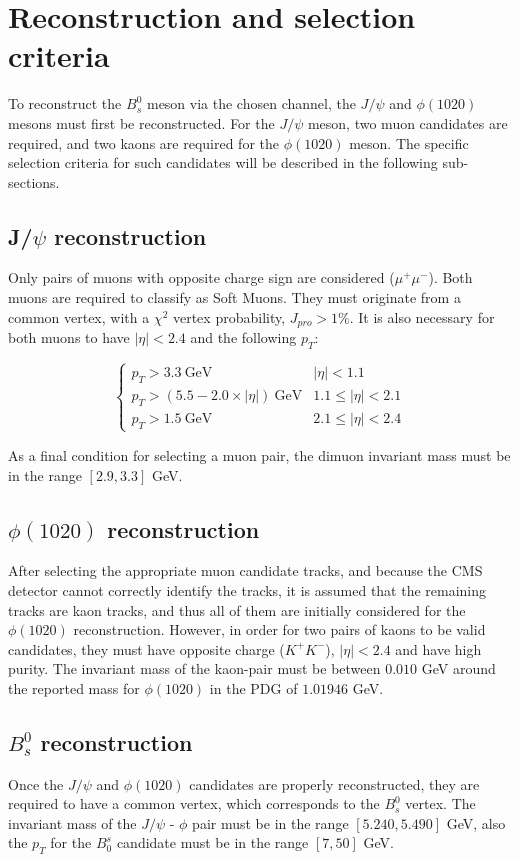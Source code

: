 \section{Reconstruction and selection criteria}%
To reconstruct the $B^0_s$ meson via the chosen channel, the $J/\psi$ and $\phi (1020)$ mesons must first be reconstructed. For the $J/\psi$ meson, two muon candidates are required, and two kaons are required for the $\phi (1020)$ meson. The specific selection criteria for such candidates will be described in the following sub-sections.
\subsection{J/$\psi$ reconstruction}

Only pairs of muons with opposite charge sign are considered ($\mu^{+}\mu^{-}$). Both muons are required to classify as Soft Muons. They must originate from a common vertex, with a  $\chi^2$ vertex probability, $J_{pro} > 1\%$. It is also necessary for both muons to have $|\eta| < 2.4$ and the following $p_T$:

\[ \begin{cases} 
	p_T > 3.3 \ \text{GeV} & |\eta| < 1.1 \\
	p_T > \left(5.5 - 2.0 \times |\eta|\right) \ \text{GeV} & 1.1 \leq |\eta| < 2.1 \\
	p_T > 1.5 \ \text{GeV} & 2.1 \leq |\eta| < 2.4 
\end{cases}
\] 

As a final condition for selecting a muon pair, the dimuon invariant mass must be in the range $[2.9, 3.3]$ GeV.
\subsection{$\phi(1020)$ reconstruction}
After selecting the appropriate muon candidate tracks, and because the CMS detector cannot correctly identify the tracks, it is assumed that the remaining tracks are kaon tracks, and thus all of them are initially considered for the $\phi(1020)$ reconstruction. However, in order for two pairs of kaons to be valid candidates, they must have opposite charge ($K^{+}K^{-}$), $|\eta| < 2.4$ and have high purity. The invariant mass of the kaon-pair must be between $0.010$ GeV around the reported mass for $\phi(1020)$ in the PDG of $1.01946$ GeV.
\subsection{$B_s^0$ reconstruction}
Once the $J/\psi$ and $\phi(1020)$ candidates are properly reconstructed, they are required to have a common vertex, which corresponds to the $B_s^0$ vertex. The invariant mass of the $J/\psi$ - $\phi$ pair must be in the range $[5.240, 5.490]$ GeV, also the $p_T$ for the $B_0^s$ candidate must be in the range $[7, 50]$ GeV. 

